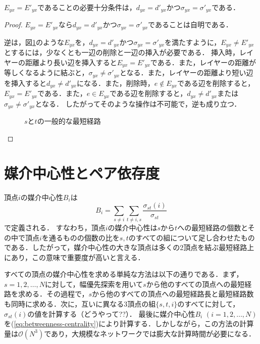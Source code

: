 \begin{lemma}
  \label{lemma:condition-of-invariability-of-shortest-path}
  $E_{yx}=E'_{yx}$であることの必要十分条件は，$d_{yx}=d'_{yx}$かつ$\sigma_{yx}=\sigma'_{yx}$である．
\end{lemma}
\begin{proof}
  $E_{yx}=E'_{yx}$なら$d_{yx}=d'_{yx}$かつ$\sigma_{yx}=\sigma'_{yx}$であることは自明である．

  逆は，図\ref{fig:proof-invariability-of-paths}のような$E_{yx}$を，$d_{yx}=d'_{yx}$かつ$\sigma_{yx}=\sigma'_{yx}$を満たすように，$E_{yx}\neq E'_{yx}$とするには，少なくとも一辺の削除と一辺の挿入が必要である．
  挿入時，レイヤーの距離より長い辺を挿入すると$E_{yx}=E'_{yx}$である．また，レイヤーの距離が等しくなるように結ぶと，$\sigma_{yx}\neq\sigma'_{yx}$となる．また，レイヤーの距離より短い辺を挿入すると$d_{yx}\neq d'_{yx}$になる．また，削除時，$e\notin E_{yx}$である辺を削除すると，$E_{yx}=E'_{yx}$である．また，$e\in E_{yx}$である辺を削除すると，$d_{yx}\neq d'_{yx}$または$\sigma_{yx}\neq\sigma'_{yx}$となる．
  したがってそのような操作は不可能で，逆も成り立つ．

  \begin{figure}
    \centering
    \def\svgwidth{.5\columnwidth}
    
    \caption{$s$と$t$の一般的な最短経路}
    \label{fig:proof-invariability-of-paths}
  \end{figure}
\end{proof}

\section{媒介中心性とペア依存度}
頂点$i$の媒介中心性$B_i$は
\begin{equation}
  B_i=\sum_{s\neq i}\sum_{t\neq {i,s}}\frac{\sigma_{st}(i)}{\sigma_{st}}
  \label{eq:betweenness-centrality}
\end{equation}
で定義される\cite{Freeman1977}．
すなわち，頂点$i$の媒介中心性は$s$から$t$への最短経路の個数とその中で頂点$i$を通るものの個数の比を$s,t$のすべての組について足し合わせたものである．したがって，媒介中心性の大きな頂点は多くの2頂点を結ぶ最短経路上にあり，この意味で重要度が高いと言える．

すべての頂点の媒介中心性を求める単純な方法は以下の通りである．まず，$s=1,2,\ldots,N$に対して，幅優先探索を用いて$s$から他のすべての頂点への最短経路を求める．その過程で，$s$から他のすべての頂点への最短経路長と最短経路数も同時に求める．次に，互いに異なる3頂点の組$\{s,t,i\}$のすべてに対して，$\sigma_{st}(i)$の値を計算する（どうやって??）．
最後に媒介中心性$B_i$ $(i=1,2,\ldots,N)$を(\ref{eq:betweenness-centrality})により計算する．しかしながら，この方法の計算量は$\mathcal{O}(N^3)$であり，大規模なネットワークでは膨大な計算時間が必要になる．

